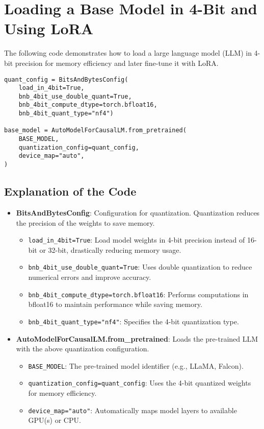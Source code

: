 \documentclass[a4paper, 12pt]{article}
\begin{document}
\newpage
\section*{Loading a Base Model in 4-Bit and Using LoRA}

The following code demonstrates how to load a large language model (LLM) in 4-bit precision for memory efficiency and later fine-tune it with LoRA.

\begin{verbatim}
quant_config = BitsAndBytesConfig(
    load_in_4bit=True,
    bnb_4bit_use_double_quant=True,
    bnb_4bit_compute_dtype=torch.bfloat16,
    bnb_4bit_quant_type="nf4")

base_model = AutoModelForCausalLM.from_pretrained(
    BASE_MODEL,
    quantization_config=quant_config,
    device_map="auto",
)
\end{verbatim}

\subsection*{Explanation of the Code}

\begin{itemize}
    \item \textbf{BitsAndBytesConfig}: Configuration for quantization. Quantization reduces the precision of the weights to save memory.
    \begin{itemize}
        \item \texttt{load\_in\_4bit=True}: Load model weights in 4-bit precision instead of 16-bit or 32-bit, drastically reducing memory usage.
        \item \texttt{bnb\_4bit\_use\_double\_quant=True}: Uses double quantization to reduce numerical errors and improve accuracy.
        \item \texttt{bnb\_4bit\_compute\_dtype=torch.bfloat16}: Performs computations in bfloat16 to maintain performance while saving memory.
        \item \texttt{bnb\_4bit\_quant\_type="nf4"}: Specifies the 4-bit quantization type.
    \end{itemize}
    
    \item \textbf{AutoModelForCausalLM.from\_pretrained}: Loads the pre-trained LLM with the above quantization configuration.
    \begin{itemize}
        \item \texttt{BASE\_MODEL}: The pre-trained model identifier (e.g., LLaMA, Falcon).
        \item \texttt{quantization\_config=quant\_config}: Uses the 4-bit quantized weights for memory efficiency.
        \item \texttt{device\_map="auto"}: Automatically maps model layers to available GPU(s) or CPU.
    \end{itemize}
\end{itemize}
\end{document}
